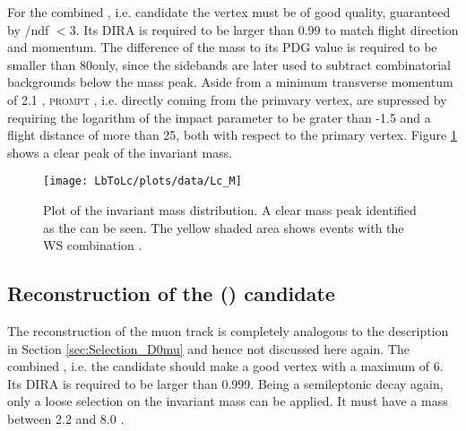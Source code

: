 For the combined \pKpi, i.e. \Lc candidate the vertex must be of good quality, guaranteed by \chisqvtx/ndf $< 3$.
Its DIRA is required to be larger than 0.99 to match flight direction and momentum.
The difference of the \Lc mass to its PDG value is required to be smaller than 80\mev only, since the \Lc sidebands are later used to subtract combinatorial backgrounds below the \Lc mass peak.
Aside from a minimum transverse momentum of 2.1 \gev, \textsc{prompt} \Lc, i.e. \Lc directly coming from the primvary vertex, are supressed by requiring the logarithm of the \Lc impact parameter to be grater than -1.5 and a flight distance \chisq of more than 25, both with respect to the primary vertex.
Figure \ref{fig:plot_Lc_M} shows a clear peak of the invariant \Lc mass.
\begin{figure}[hptb]
    \centering
	\texttt{[image: LbToLc/plots/data/Lc\_M]}	
	\caption{Plot of the invariant \pKpi mass distribution. A clear mass peak identified as the \Lc can be seen. The yellow shaded area shows events with the WS combination \Lc\mup.}
	\label{fig:plot_Lc_M}
\end{figure}

\subsection{Reconstruction of the \Lb (\Lc\mun) candidate}
The reconstruction of the muon track is completely analogous to the description in Section \ref{sec:Selection_D0mu} and hence not discussed here again.
The combined \Lc\mun, i.e. the \Lb candidate should make a good vertex with a maximum \chisqvtx of 6.
Its DIRA is required to be larger than 0.999.
Being a semileptonic decay again, only a loose selection on the invariant \Lc\mun mass can be applied.
It must have a mass between 2.2 and 8.0 \gev.

